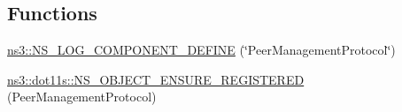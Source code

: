 \subsection*{Functions}
\begin{DoxyCompactItemize}
\item 
\hyperlink{namespacens3_ade14093d6deea7aead0b55dbe2cc0b75}{ns3\+::\+N\+S\+\_\+\+L\+O\+G\+\_\+\+C\+O\+M\+P\+O\+N\+E\+N\+T\+\_\+\+D\+E\+F\+I\+NE} (\char`\"{}Peer\+Management\+Protocol\char`\"{})
\item 
\hyperlink{namespacens3_1_1dot11s_acfc0b4650ed5a7f67c632df04dcd2fe0}{ns3\+::dot11s\+::\+N\+S\+\_\+\+O\+B\+J\+E\+C\+T\+\_\+\+E\+N\+S\+U\+R\+E\+\_\+\+R\+E\+G\+I\+S\+T\+E\+R\+ED} (Peer\+Management\+Protocol)
\end{DoxyCompactItemize}
